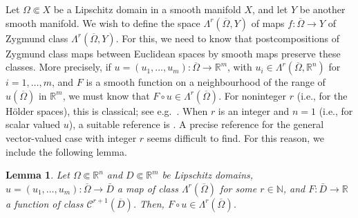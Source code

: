 \documentclass[11pt]{amsart}
\numberwithin{equation}{section}
\newtheorem{lemma}[theorem]{Lemma}
\theoremstyle{definition}
\newcommand\Cscr{\mathscr{C}}
\newcommand\N{\mathbb{N}}
\newcommand\R{\mathbb{R}}
\begin{document}
Let $\Omega\Subset X$ be a Lipschitz domain in a smooth
manifold $X$, and let $Y$ be another smooth manifold.
We wish to define the space 
$
	\Lambda^r(\overline \Omega,Y)
$
of maps $f:\overline\Omega\to Y$ of Zygmund class 
$\Lambda^r(\overline\Omega, Y)$.
For this, we need to know that postcompositions of Zygmund 
class maps between Euclidean spaces by smooth maps 
preserve these classes. More precisely, if 
$u=(u_1,\ldots,u_m):\overline \Omega\to \R^m$, 
with $u_i\in \Lambda^r(\overline\Omega,\R^n)$ for $i=1,\ldots,m$, 
and $F$ is a smooth function on a neighbourhood of the range 
of $u(\overline \Omega)$ in $\R^m$, we must know that 
$F\circ u \in \Lambda^r(\overline \Omega)$.
For noninteger $r$ (i.e., for the H\"older spaces), this is 
classical; see e.g.\  \cite{GilbargTrudinger1983}.
When $r$ is an integer and $n=1$ (i.e., for scalar valued $u$), 
a suitable reference is \cite{BourdaudCristoforis2002}. 
A precise reference for the general vector-valued case 
with integer $r$ seems difficult to find.
For this reason, we include the following lemma.

%
%
\begin{lemma}\label{lem:composition}
Let $\Omega\Subset\R^n$ and $D\Subset \R^m$ be Lipschitz domains, 
$u=(u_1,\ldots,u_m): \overline\Omega\to \bar D$ a map of class 
$\Lambda^r(\overline \Omega)$ for some $r\in \N$, and 
$F: \bar D \to \mathbb R$ a function of class $\Cscr^{r+1}(\overline D)$. 
Then, $F\circ u\in \Lambda^r(\overline \Omega)$.
\end{lemma}
\end{document}
